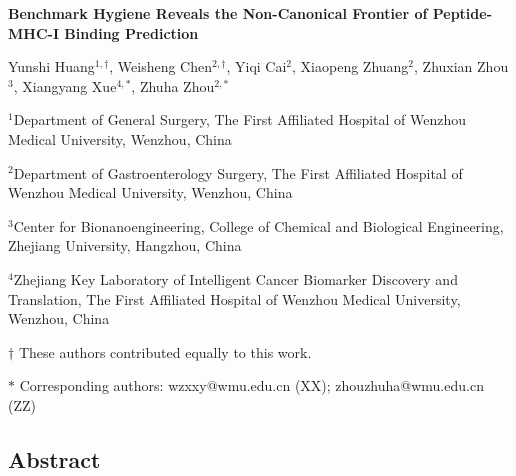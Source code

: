 \documentclass[10pt]{article}
\author{}
\date{}
\begin{document}
\begin{center}
{\LARGE\bfseries Benchmark Hygiene Reveals the Non-Canonical Frontier of Peptide-MHC-I Binding Prediction\par}
\vspace{1em}
{\large Yunshi Huang$^{1,\dagger}$, Weisheng Chen$^{2,\dagger}$, Yiqi Cai$^{2}$, Xiaopeng Zhuang$^{2}$, Zhuxian Zhou$^{3}$, Xiangyang Xue$^{4,*}$, Zhuha Zhou$^{2,*}$\par}
\vspace{0.6em}
{\normalsize $^{1}$Department of General Surgery, The First Affiliated Hospital of Wenzhou Medical University, Wenzhou, China\par}
{\normalsize $^{2}$Department of Gastroenterology Surgery, The First Affiliated Hospital of Wenzhou Medical University, Wenzhou, China\par}
{\normalsize $^{3}$Center for Bionanoengineering, College of Chemical and Biological Engineering, Zhejiang University, Hangzhou, China\par}
{\normalsize $^{4}$Zhejiang Key Laboratory of Intelligent Cancer Biomarker Discovery and Translation, The First Affiliated Hospital of Wenzhou Medical University, Wenzhou, China\par}
\vspace{0.6em}
{\normalsize $\dagger$ These authors contributed equally to this work.\par}
{\normalsize $*$ Corresponding authors: wzxxy@wmu.edu.cn (XX); zhouzhuha@wmu.edu.cn (ZZ)\par}
\end{center}

\subsection{Abstract}\label{abstract}
\end{document}
